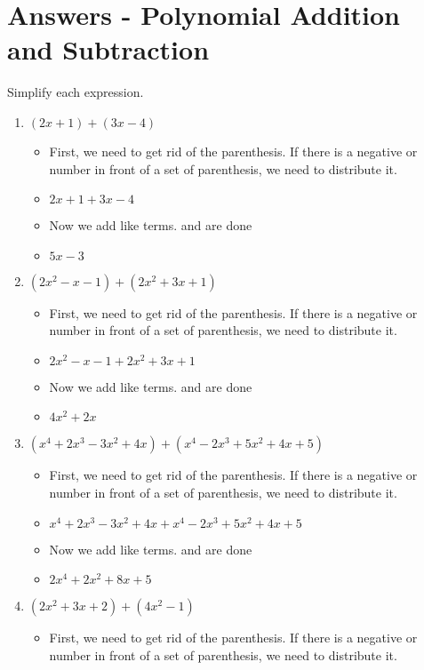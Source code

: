 \section{Answers - Polynomial Addition and Subtraction}
Simplify each expression.
\begin{enumerate}
\item $(2x+1)+(3x-4)$
  \begin{itemize}
  \item [] First, we need to get rid of the parenthesis. If there is a negative or number in front of a set of parenthesis, we need to distribute it.
  \item $2x+1+3x-4$
  \item [] Now we add like terms. and are done
  \item $5x-3$
  \end{itemize}
\item $(2x^{2}-x-1)+(2x^{2}+3x+1)$
  \begin{itemize}
  \item [] First, we need to get rid of the parenthesis. If there is a negative or number in front of a set of parenthesis, we need to distribute it.
  \item $2x^{2}-x-1+2x^{2}+3x+1$
  \item [] Now we add like terms. and are done
  \item $4x^{2}+2x$
  \end{itemize}
\item $(x^{4}+2x^{3}-3x^{2}+4x)+(x^{4}-2x^{3}+5x^{2}+4x+5)$
  \begin{itemize}
  \item [] First, we need to get rid of the parenthesis. If there is a negative or number in front of a set of parenthesis, we need to distribute it.
  \item $x^{4}+2x^{3}-3x^{2}+4x+x^{4}-2x^{3}+5x^{2}+4x+5$
  \item [] Now we add like terms. and are done
  \item $2x^{4}+2x^{2}+8x+5$
  \end{itemize}
\item $(2x^{2}+3x+2)+(4x^{2}-1)$
  \begin{itemize}
  \item [] First, we need to get rid of the parenthesis. If there is a negative or number in front of a set of parenthesis, we need to distribute it.

\end{itemize}
\end{enumerate}

